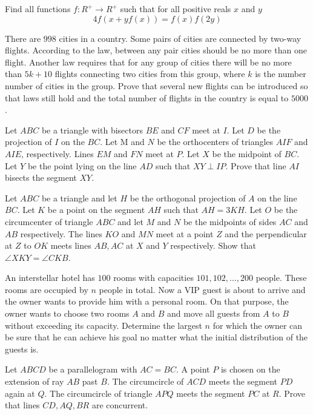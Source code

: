 \documentclass[11pt]{scrartcl}
\begin{document}
\begin{problem}[770681078031656]
Find all functions $f:R^+\rightarrow R^+$ such that for all positive reals $x$ and $y$
$$4f(x+yf(x))=f(x)f(2y)$$
\end{problem}
\begin{problem}[521339998508550]
There are $998$ cities in a country. Some pairs of cities are connected by two-way flights. According to the law, between any pair cities should be no more than one flight. Another law requires that for any group of cities there will be no more than $5k+10$ flights connecting two cities from this group, where $k$ is the number number of cities in the group. Prove that several new flights can be introduced so that laws still hold and the total number of flights in the country is equal to $5000$.
\end{problem}
\begin{problem}[3175174607535531817]
Let $ABC$ be a triangle with bisectors $BE$ and $CF$ meet at $I$. Let $D$ be the projection of $I$ on the $BC$. Let M and $N$ be the orthocenters of triangles $AIF$ and $AIE$, respectively. Lines $EM$ and $FN$ meet at $P.$ Let $X$ be the midpoint of $BC$. Let $Y$ be the point lying on the line $AD$ such that $XY \perp IP$. Prove that line $AI$ bisects the segment $XY$.
\end{problem}
\begin{problem}[493493847475466779]
Let $ABC$ be a triangle and let $H$ be the orthogonal projection of $A$ on the line $BC$. Let $K$ be a point on the segment $AH$ such that $AH = 3 KH$. Let $O$ be the circumcenter of triangle $ABC$ and let $M$ and $N$ be the midpoints of sides $AC$ and $AB$ respectively. The lines $KO$ and $MN$ meet at a point $Z$ and the perpendicular at $Z$ to $OK$ meets lines $AB, AC$ at $X$ and $Y$ respectively. Show that $\angle XKY = \angle CKB$.
\end{problem}
\begin{problem}[4429559846138102630]
An interstellar hotel has $100$ rooms with capacities $101,102,\ldots, 200$ people. These rooms are occupied by $n$ people in total. Now a VIP guest is about to arrive and the owner wants to provide him with a personal room. On that purpose, the owner wants to choose two rooms $A$ and $B$ and move all guests from $A$ to $B$ without exceeding its capacity. Determine the largest $n$ for which the owner can be sure that he can achieve his goal no matter what the initial distribution of the guests is.
\end{problem}
\begin{problem}[682786464566571]
Let $ABCD$ be a parallelogram with $AC=BC.$ A point $P$ is chosen on the extension of ray $AB$ past $B.$ The circumcircle of $ACD$ meets the segment $PD$ again at $Q.$ The circumcircle of triangle $APQ$ meets the segment $PC$ at $R.$ Prove that lines $CD,AQ,BR$ are concurrent.
\end{problem}
\end{document}
